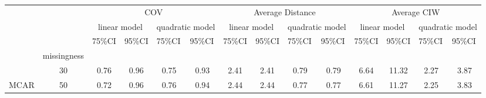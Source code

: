 \documentclass[12pt, fullpage, a4paper]{article}
\begin{document}
\newpage
\begin{table}
	\begin{tabular}{cc|cccc|cccc|cccc}
		\multicolumn{2}{l|}{}                             & \multicolumn{4}{c|}{COV}                                                                                           & \multicolumn{4}{c|}{Average Distance}                                                                              & \multicolumn{4}{c}{Average CIW}                                                                                   \\ \cline{3-14} 
		\multicolumn{1}{l}{}      & \multicolumn{1}{l|}{} & \multicolumn{2}{c}{linear model}                        & \multicolumn{2}{c|}{quadratic model}                     & \multicolumn{2}{c}{linear model}                        & \multicolumn{2}{c|}{quadratic model}                     & \multicolumn{2}{c}{linear model}                        & \multicolumn{2}{c}{quadratic model}                     \\ \hline
		\multicolumn{1}{l|}{}     & \multicolumn{1}{l|}{} & \multicolumn{1}{l}{75\%CI} & \multicolumn{1}{l}{95\%CI} & \multicolumn{1}{l}{75\%CI} & \multicolumn{1}{l|}{95\%CI} & \multicolumn{1}{l}{75\%CI} & \multicolumn{1}{l}{95\%CI} & \multicolumn{1}{l}{75\%CI} & \multicolumn{1}{l|}{95\%CI} & \multicolumn{1}{l}{75\%CI} & \multicolumn{1}{l}{95\%CI} & \multicolumn{1}{l}{75\%CI} & \multicolumn{1}{l}{95\%CI} \\
		\multicolumn{1}{c|}{}     & missingness           &                            &                            &                            &                             &                            &                            &                            &                             &                            &                            &                            &                            \\ \cline{2-14} 
		\multicolumn{1}{c|}{}     & 30                    & 0.76                       & 0.96                       & 0.75                       & 0.93                        & 2.41                       & 2.41                       & 0.79                       & 0.79                        & 6.64                       & 11.32                      & 2.27                       & 3.87                       \\
		\multicolumn{1}{c|}{MCAR} & 50                    & 0.72                       & 0.96                       & 0.76                       & 0.94                        & 2.44                       & 2.44                       & 0.77                       & 0.77                        & 6.61                       & 11.27                      & 2.25                       & 3.83                       \\

\end{tabular}
\end{table}
\end{document}
